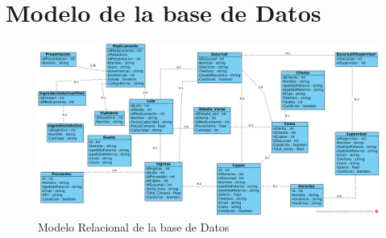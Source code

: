\chapter{Modelo de la base de Datos}

\begin{figure}[htbp!]
	\begin{center}
		\includegraphics[width=.9\textwidth]{images/diagramaRelacional}
		\caption{Modelo Relacional de la base de Datos}
		\label{fig:modeloDeDominio}
	\end{center}
\end{figure} 
